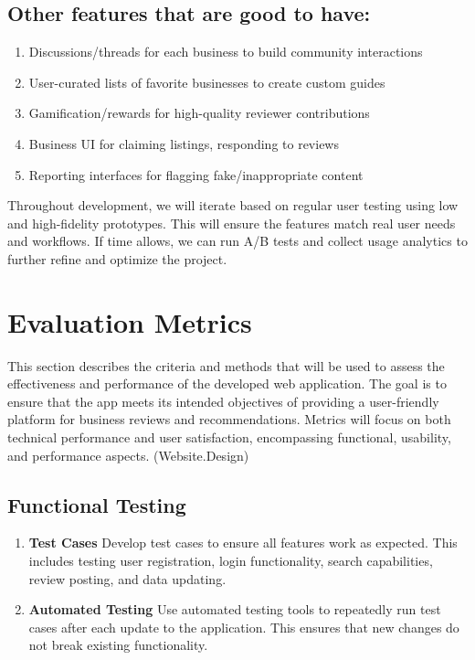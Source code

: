 \documentclass[10pt,twocolumn]{article}
\begin{document}
    \subsection{Other features that are good to have:}
    \begin{enumerate}
        \item Discussions/threads for each business to build community interactions
        \item User-curated lists of favorite businesses to create custom guides
        \item Gamification/rewards for high-quality reviewer contributions  
        \item Business UI for claiming listings, responding to reviews 
        \item Reporting interfaces for flagging fake/inappropriate content

    \end{enumerate}
    Throughout development, we will iterate based on regular user testing using low and high-fidelity prototypes. This will ensure the features match real user needs and workflows. If time allows, we can run A/B tests and collect usage analytics to further refine and optimize the project.
    \section{Evaluation Metrics}
    This section describes the criteria and methods that will be used to assess the effectiveness and performance of the developed web application. The goal is to ensure that the app meets its intended objectives of providing a user-friendly platform for business reviews and recommendations. Metrics will focus on both technical performance and user satisfaction, encompassing functional, usability, and performance aspects. (Website.Design)
    \subsection{Functional Testing}
        \begin{enumerate}
        \item \textbf{Test Cases} Develop test cases to ensure all features work as expected. This includes testing user registration, login functionality, search capabilities, review posting, and data updating.
        \item \textbf{Automated Testing} Use automated testing tools to repeatedly run test cases after each update to the application. This ensures that new changes do not break existing functionality.
    \end{enumerate}
\end{document}
